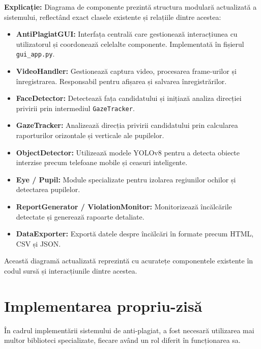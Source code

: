 \documentclass[12pt,a4paper]{article}
\begin{document}
\textbf{Explicație:} Diagrama de componente prezintă structura modulară actualizată a sistemului, reflectând exact clasele existente și relațiile dintre acestea:
\begin{itemize}
    \item \textbf{AntiPlagiatGUI:} Interfața centrală care gestionează interacțiunea cu utilizatorul și coordonează celelalte componente. Implementată în fișierul \texttt{gui\_app.py}.
    
    \item \textbf{VideoHandler:} Gestionează captura video, procesarea frame-urilor și înregistrarea. Responsabil pentru afișarea și salvarea înregistrărilor.
    
    \item \textbf{FaceDetector:} Detectează fața candidatului și inițiază analiza direcției privirii prin intermediul \texttt{GazeTracker}.
    
    \item \textbf{GazeTracker:} Analizează direcția privirii candidatului prin calcularea raporturilor orizontale și verticale ale pupilelor.
    
    \item \textbf{ObjectDetector:} Utilizează modele YOLOv8 pentru a detecta obiecte interzise precum telefoane mobile și ceasuri inteligente.
    
    \item \textbf{Eye / Pupil:} Module specializate pentru izolarea regiunilor ochilor și detectarea pupilelor.
    
    \item \textbf{ReportGenerator / ViolationMonitor:} Monitorizează încălcările detectate și generează rapoarte detaliate.
    
    \item \textbf{DataExporter:} Exportă datele despre încălcări în formate precum HTML, CSV și JSON.
\end{itemize}

Această diagramă actualizată reprezintă cu acuratețe componentele existente în codul sursă și interacțiunile dintre acestea.

\section{Implementarea propriu-zisă}

În cadrul implementării sistemului de anti-plagiat, a fost necesară utilizarea mai multor biblioteci specializate, fiecare având un rol diferit în funcționarea sa.
\end{document}
